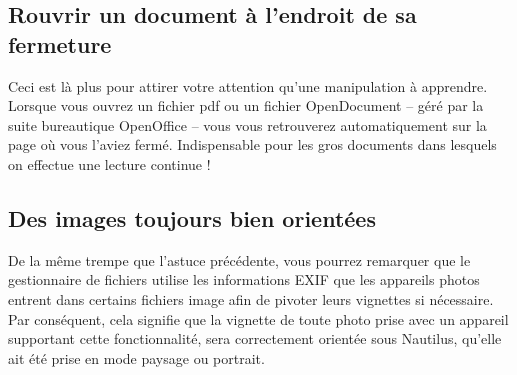 \subsection{Rouvrir un document à l'endroit de sa fermeture}
Ceci est là plus pour attirer votre attention qu'une manipulation à apprendre. Lorsque vous ouvrez un fichier pdf ou un fichier OpenDocument -- géré par la suite bureautique OpenOffice -- vous vous retrouverez automatiquement sur la page où vous l'aviez fermé. Indispensable pour les gros documents dans lesquels on effectue une lecture continue !
\subsection{Des images toujours bien orientées}
De la même trempe que l'astuce précédente, vous pourrez remarquer que le gestionnaire de fichiers utilise les informations EXIF que les appareils photos entrent dans certains fichiers image afin de pivoter leurs vignettes si nécessaire. Par conséquent, cela signifie que la vignette de toute photo prise avec un appareil supportant cette fonctionnalité, sera correctement orientée sous Nautilus, qu'elle ait été prise en mode paysage ou portrait.
